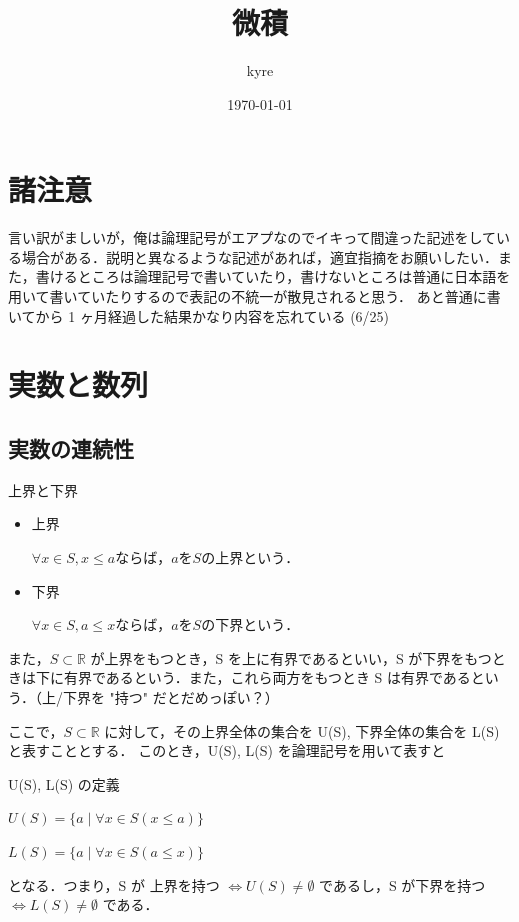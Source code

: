 \documentclass[a4paper]{ltjsarticle}
\title{微積}
\author{kyre}
\date{\today}
\begin{document}
\section*{諸注意}
言い訳がましいが，俺は論理記号がエアプなのでイキって間違った記述をしている場合がある．説明と異なるような記述があれば，適宜指摘をお願いしたい．また，書けるところは論理記号で書いていたり，書けないところは普通に日本語を用いて書いていたりするので表記の不統一が散見されると思う．
あと普通に書いてから 1 ヶ月経過した結果かなり内容を忘れている (6/25)

\section{実数と数列}

\subsection{実数の連続性}

\begin{mytcb}{上界と下界}{}
\begin{itemize}
\item 上界 

\begin{math}
\forall x \in S, x \leq a ならば， a を S の上界という．
\end{math}

\item 下界 

\begin{math}
\forall x \in S, a \leq x ならば，a を S の下界という．
\end{math}
\end{itemize}
\end{mytcb}

また，$S \subset \mathbb{R}$ が上界をもつとき，S を上に有界であるといい，S が下界をもつときは下に有界であるという．また，これら両方をもつとき S は有界であるという．（上/下界を "持つ" だとだめっぽい？）

ここで，$S \subset \mathbb{R}$ に対して，その上界全体の集合を U(S), 下界全体の集合を L(S) と表すこととする．
このとき，U(S), L(S) を論理記号を用いて表すと
\begin{mytcb}{U(S), L(S) の定義}{}
\centerline
{$
U(S) = \{a \mid \forall x \in S (x \leq a)\}
$}
\centerline
{$
L(S) = \{a \mid \forall x \in S (a \leq x)\}
$}
\end{mytcb}
となる．つまり，S が 上界を持つ $\Leftrightarrow U(S) \neq \emptyset$  であるし，S が下界を持つ $\Leftrightarrow L(S) \neq \emptyset$ である．
\end{document}
